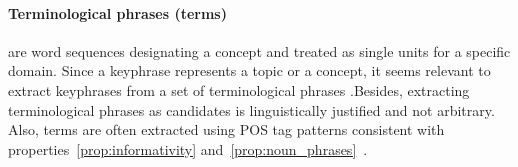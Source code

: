   \paragraph{Terminological phrases (terms)} are word sequences designating a
  concept and treated as single units for a specific domain. Since a keyphrase
  represents a topic or a concept, it seems relevant to extract
  keyphrases from  a set of terminological phrases .Besides, extracting
  terminological phrases as candidates is linguistically justified and not
  arbitrary. Also, terms are often extracted using POS tag
  patterns consistent with properties~\ref{prop:informativity}
  and~\ref{prop:noun_phrases}~\cite{castellvi2001automatictermdetection}.


